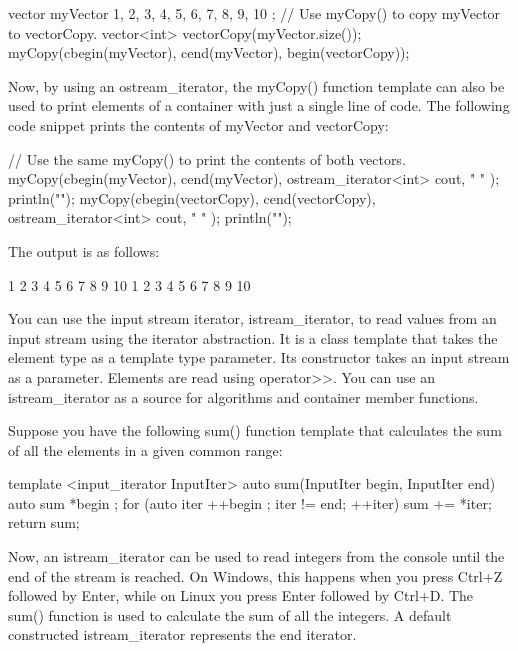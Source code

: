 \begin{cpp}
vector myVector { 1, 2, 3, 4, 5, 6, 7, 8, 9, 10 };
// Use myCopy() to copy myVector to vectorCopy.
vector<int> vectorCopy(myVector.size());
myCopy(cbegin(myVector), cend(myVector), begin(vectorCopy));
\end{cpp}

Now, by using an ostream\_iterator, the myCopy() function template can also be used to print elements of a container with just a single line of code. The following code snippet prints the contents of myVector and vectorCopy:

\begin{cpp}
// Use the same myCopy() to print the contents of both vectors.
myCopy(cbegin(myVector), cend(myVector), ostream_iterator<int> { cout, " " });
println("");
myCopy(cbegin(vectorCopy), cend(vectorCopy), ostream_iterator<int> { cout, " " });
println("");
\end{cpp}

The output is as follows:

\begin{shell}
1 2 3 4 5 6 7 8 9 10
1 2 3 4 5 6 7 8 9 10
\end{shell}


You can use the input stream iterator, istream\_iterator, to read values from an input stream using the iterator abstraction. It is a class template that takes the element type as a template type parameter. Its constructor takes an input stream as a parameter. Elements are read using operator>{}>. You can use an istream\_iterator as a source for algorithms and container member functions.

Suppose you have the following sum() function template that calculates the sum of all the elements in a given common range:

\begin{cpp}
template <input_iterator InputIter>
auto sum(InputIter begin, InputIter end)
{
    auto sum { *begin };
    for (auto iter { ++begin }; iter != end; ++iter) { sum += *iter; }
    return sum;
}
\end{cpp}

Now, an istream\_iterator can be used to read integers from the console until the end of the stream is reached. On Windows, this happens when you press Ctrl+Z followed by Enter, while on Linux you press Enter followed by Ctrl+D. The sum() function is used to calculate the sum of all the integers. A default constructed istream\_iterator represents the end iterator.

